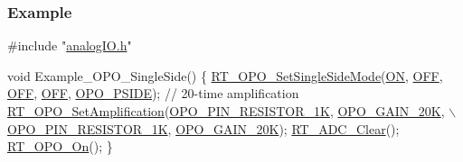 \subsubsection*{Example}


\begin{DoxyCode}
\textcolor{preprocessor}{#include "\mbox{\hyperlink{a00002}{analogIO.h}}"}

\textcolor{keywordtype}{void} Example\_OPO\_SingleSide()
\{
    \mbox{\hyperlink{a00002_a6438defc0d6280f2b5baedc039f2e314}{RT\_OPO\_SetSingleSideMode}}(\mbox{\hyperlink{a00020_ab43e533f3793920486fb81c580f71564a977d478dacaae531f95695750d1e9d03}{ON}}, \mbox{\hyperlink{a00020_ab43e533f3793920486fb81c580f71564aac132f2982b98bcaa3445e535a03ff75}{OFF}}, \mbox{\hyperlink{a00020_ab43e533f3793920486fb81c580f71564aac132f2982b98bcaa3445e535a03ff75}{OFF}}, \mbox{\hyperlink{a00020_ab43e533f3793920486fb81c580f71564aac132f2982b98bcaa3445e535a03ff75}{OFF}}, 
      \mbox{\hyperlink{a00002_afb2207320139ac264d5cc1600d3cae9ea740f1053bc0489a53c4cfe9bfc3de403}{OPO\_PSIDE}});
    \textcolor{comment}{// 20-time amplification}
    \mbox{\hyperlink{a00002_ab2a6c21c91c7f05f3de9fefbd30ff95b}{RT\_OPO\_SetAmplification}}(\mbox{\hyperlink{a00002_a4600c8687e3e17269633cb3fbd771af9a7b2e9c0067b4d8197ded8832c5615120}{OPO\_PIN\_RESISTOR\_1K}}, 
      \mbox{\hyperlink{a00002_a6424f6db97a2e691b73af9c4053f1650a44bf632448f2bed40aad8456d4ab211e}{OPO\_GAIN\_20K}}, \(\backslash\)
                            \mbox{\hyperlink{a00002_a4600c8687e3e17269633cb3fbd771af9a7b2e9c0067b4d8197ded8832c5615120}{OPO\_PIN\_RESISTOR\_1K}}, \mbox{\hyperlink{a00002_a6424f6db97a2e691b73af9c4053f1650a44bf632448f2bed40aad8456d4ab211e}{OPO\_GAIN\_20K}});
    \mbox{\hyperlink{a00002_a6f788ef3b57dbc478ab10de7356574fa}{RT\_ADC\_Clear}}();
    \mbox{\hyperlink{a00002_a6304dd2bf95eefdafda9caa159beafdc}{RT\_OPO\_On}}();
\}


\end{DoxyCode}
